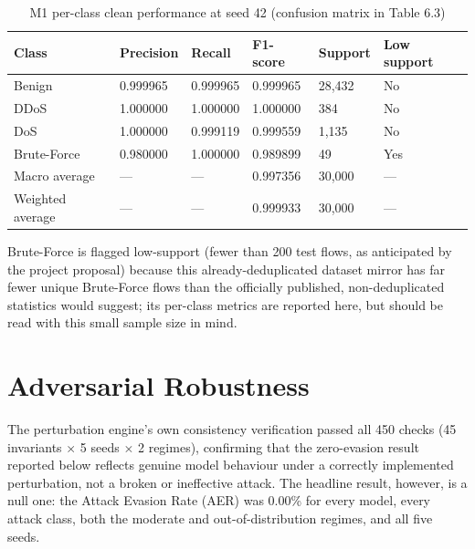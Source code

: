 \documentclass[12pt,a4paper]{report}
\begin{document}
\begin{table}[h]\centering
\caption{M1 per-class clean performance at seed 42 (confusion matrix in Table 6.3)}
\begin{tabularx}{\linewidth}{XXXXXX}
\toprule
\textbf{Class} & \textbf{Precision} & \textbf{Recall} & \textbf{F1-score} & \textbf{Support} & \textbf{Low support} \\
\midrule
Benign & 0.999965 & 0.999965 & 0.999965 & 28,432 & No \\
DDoS & 1.000000 & 1.000000 & 1.000000 & 384 & No \\
DoS & 1.000000 & 0.999119 & 0.999559 & 1,135 & No \\
Brute-Force & 0.980000 & 1.000000 & 0.989899 & 49 & Yes \\
Macro average & --- & --- & 0.997356 & 30,000 & --- \\
Weighted average & --- & --- & 0.999933 & 30,000 & --- \\
\bottomrule
\end{tabularx}
\end{table}
Brute-Force is flagged low-support (fewer than 200 test flows, as anticipated by the project proposal) because this already-deduplicated dataset mirror has far fewer unique Brute-Force flows than the officially published, non-deduplicated statistics would suggest; its per-class metrics are reported here, but should be read with this small sample size in mind.

\section{Adversarial Robustness}
The perturbation engine's own consistency verification passed all 450 checks (45 invariants $\times$ 5 seeds $\times$ 2 regimes), confirming that the zero-evasion result reported below reflects genuine model behaviour under a correctly implemented perturbation, not a broken or ineffective attack. The headline result, however, is a null one: the Attack Evasion Rate (AER) was 0.00\% for every model, every attack class, both the moderate and out-of-distribution regimes, and all five seeds.
\end{document}
